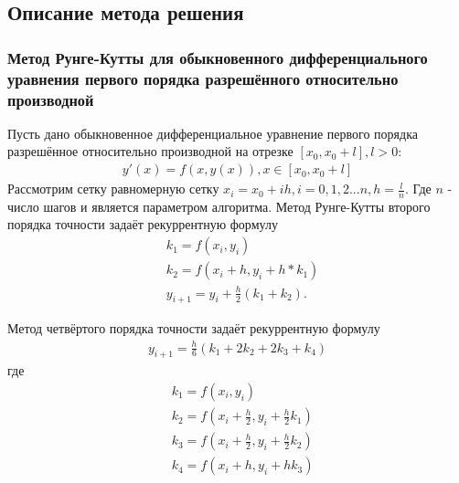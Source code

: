 \documentclass[a4paper,12pt,titlepage,finall]{article}
\begin{document}
\subsection{Описание метода решения}
\subsubsection{Метод Рунге-Кутты для обыкновенного дифференциального уравнения первого порядка разрешённого относительно производной}
Пусть дано обыкновенное дифференциальное уравнение первого порядка разрешённое относительно производной на отрезке $[x_0, x_0 + l], l > 0$:
\begin{align*}
y'(x)=f(x,y(x)), x \in [x_0, x_0 + l]
\end{align*}
Рассмотрим сетку равномерную сетку $x_i = x_0 + ih, i = 0, 1, 2 ... n, h = \frac{l}{n}$. Где $n$ - число шагов и является параметром алгоритма. Метод Рунге-Кутты второго порядка точности задаёт рекуррентную формулу
\begin{align*}
&k_1 = f(x_i, y_i)\\
&k_2 = f(x_i + h, y_i + h * k_1)\\
&y_{i + 1} = y_i + \frac{h}{2}(k_1 + k_2).
\end{align*} 
\par
Метод четвёртого порядка точности задаёт рекуррентную формулу
\begin{align*}
y_{i+1} = \frac{h}{6} (k_1 +2k_2 + 2k_3 + k_4)
\end{align*}
где
\begin{align*}
&k_1 = f(x_i, y_i)\\
&k_2 = f(x_i + \frac{h}{2}, y_i + \frac{h}{2}k_1)\\
&k_3 = f(x_i + \frac{h}{2}, y_i + \frac{h}{2}k_2)\\
&k_4 = f(x_i + h, y_i + hk_3)
\end{align*}
\end{document}
